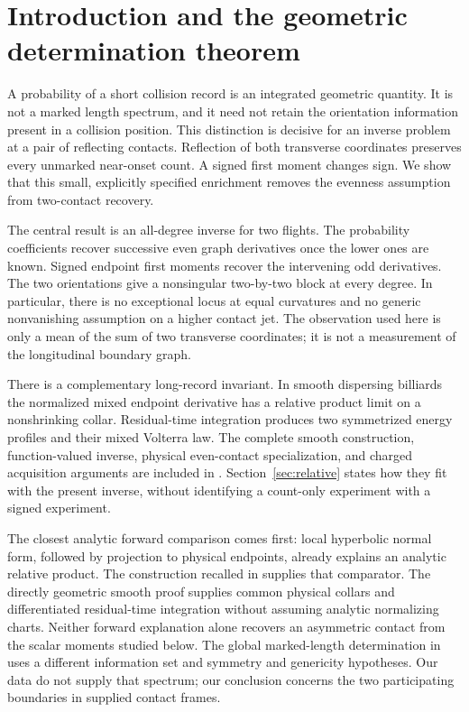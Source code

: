 \section{Introduction and the geometric determination theorem}
\label{sec:introduction}
A probability of a short collision record is an integrated geometric
quantity. It is not a marked length spectrum, and it need not retain the
orientation information present in a collision position. This distinction
is decisive for an inverse problem at a pair of reflecting contacts.
Reflection of both transverse coordinates preserves every unmarked
near-onset count. A signed first moment changes sign. We show that this
small, explicitly specified enrichment removes the evenness assumption
from two-contact recovery.

The central result is an all-degree inverse for two flights. The probability
coefficients recover successive even graph derivatives once the lower
ones are known. Signed endpoint first moments recover the intervening odd
derivatives. The two orientations give a nonsingular two-by-two block at
every degree. In particular, there is no exceptional locus at equal
curvatures and no generic nonvanishing assumption on a higher contact jet.
The observation used here is only a mean of the sum of two transverse
coordinates; it is not a measurement of the longitudinal boundary graph.

There is a complementary long-record invariant. In smooth dispersing
billiards the normalized mixed endpoint derivative has a relative product
limit on a nonshrinking collar. Residual-time integration produces two
symmetrized energy profiles and their mixed Volterra law. The complete
smooth construction, function-valued inverse, physical even-contact
specialization, and charged acquisition arguments are included in
\cite{Companion}. Section~\ref{sec:relative} states how they fit with the
present inverse, without identifying a count-only experiment with a
signed experiment.

The closest analytic forward comparison comes first: local hyperbolic
normal form, followed by projection to physical endpoints, already
explains an analytic relative product. The construction recalled in
\cite[Section 2]{DSKL} supplies that comparator. The directly geometric
smooth proof supplies common physical collars and differentiated
residual-time integration without assuming analytic normalizing charts.
Neither forward explanation alone recovers an asymmetric contact from
the scalar moments studied below. The global marked-length determination
in \cite{DSKL} uses a different information set and symmetry and genericity
hypotheses. Our data do not supply that spectrum; our conclusion concerns
the two participating boundaries in supplied contact frames.

